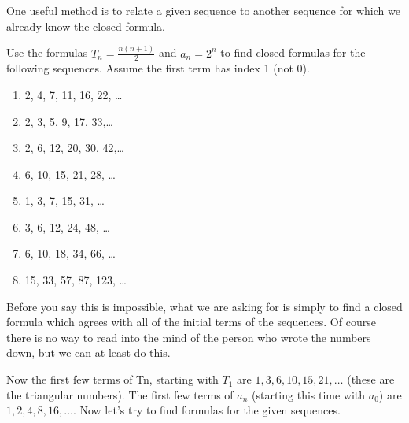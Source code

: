\documentclass[12pt]{article}
\begin{document}
One useful method is to relate a given sequence to another sequence for which we already know the closed formula.

\begin{example}
  Use the formulas $T_n = \frac{n(n+1)}{2}$ and $a_n = 2^n$ to find closed formulas for the following sequences.  Assume the first term has index 1 (not 0).
  \begin{enumerate}
    \item 2, 4, 7, 11, 16, 22, \ldots
    \item 2, 3, 5, 9, 17, 33,\ldots
    \item 2, 6, 12, 20, 30, 42,\ldots
    \item 6, 10, 15, 21, 28, \ldots
    \item 1, 3, 7, 15, 31, \ldots
    \item 3, 6, 12, 24, 48, \ldots
    \item 6, 10, 18, 34, 66, \ldots
    \item 15, 33, 57, 87, 123, \ldots
  \end{enumerate}

\begin{solution}
  Before you say this is impossible, what we are asking for is simply to find a closed formula which agrees with all of the initial terms of the sequences.  Of course there is no way to read into the mind of the person who wrote the numbers down, but we can at least do this.

  Now the first few terms of \gls{Tn}, starting with $T_1$ are $1, 3, 6, 10, 15, 21, \ldots$ (these are the triangular numbers).  The first few terms of $a_n$ (starting this time with $a_0$) are $1, 2, 4, 8, 16, \ldots$.  Now let's try to find formulas for the given sequences.


\end{solution}
\end{example}
\end{document}
